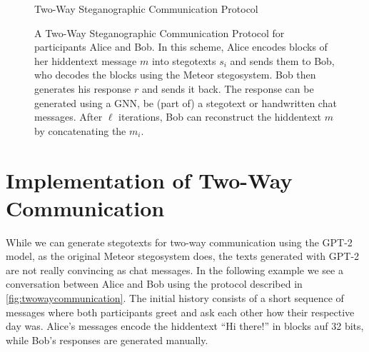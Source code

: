 \begin{figure}[htbp]
	\centering
	\begin{msc}[instance distance=4cm,action width=5cm]{Two-Way Steganographic Communication Protocol}
		\nextlevel[2]
		\nextlevel[3]
		\nextlevel[2]
		\nextlevel[3]
		\nextlevel
		\nextlevel[2]
		\nextlevel[3]
		\nextlevel
		\nextlevel[2]
		\nextlevel[3]
		\nextlevel
	\end{msc}
	\caption{
	A Two-Way Steganographic Communication Protocol for participants Alice and Bob.
	In this scheme, Alice encodes blocks of her hiddentext message $m$ into stegotexts $s_i$ and sends them to Bob, who decodes the blocks using the Meteor stegosystem.
	Bob then generates his response $r$ and sends it back.
	The response can be generated using a GNN, be (part of) a stegotext or handwritten chat messages.
	After $\ell$ iterations, Bob can reconstruct the hiddentext $m$ by concatenating the $m_i$.
	}
	\label{fig:twowaycommunication}
\end{figure}

\section{Implementation of Two-Way Communication}
While we can generate stegotexts for two-way communication using the GPT-2 model, as the original Meteor stegosystem does, the texts generated with GPT-2 are not really convincing as chat messages. 
In the following example we see a conversation between Alice and Bob using the protocol described in \autoref{fig:twowaycommunication}.
The initial history consists of a short sequence of messages where both participants greet and ask each other how their respective day was.
Alice's messages encode the hiddentext ``Hi there!'' in blocks auf 32 bits, while Bob's responses are generated manually.

